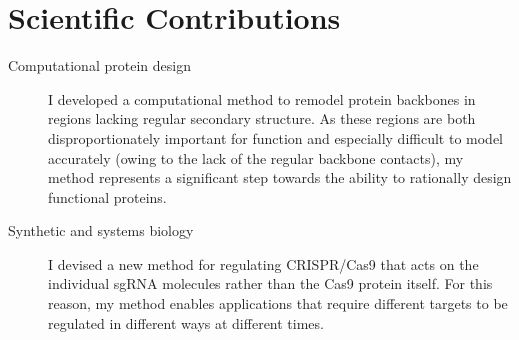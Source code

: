 \section{Scientific Contributions}

\begin{description}

\item[Computational protein design] 
        I developed a computational method to remodel protein backbones in 
        regions lacking regular secondary structure.  As these regions are both 
        disproportionately important for function and especially difficult to 
        model accurately (owing to the lack of the regular backbone contacts), 
        my method represents a significant step towards the ability to 
        rationally design functional proteins.

\item[Synthetic and systems biology]
        I devised a new method for regulating CRISPR/Cas9 that acts on the 
        individual sgRNA molecules rather than the Cas9 protein itself.  For 
        this reason, my method enables applications that require different 
        targets to be regulated in different ways at different times.

\end{description}
